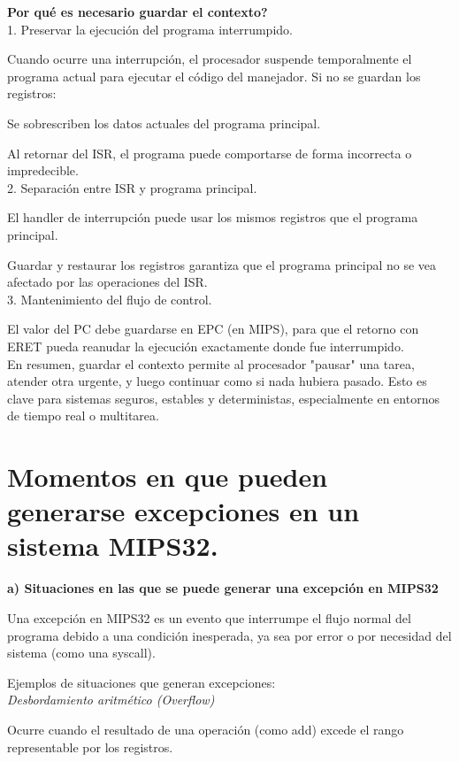 \documentclass[]{article}
\begin{document}
\textbf{Por qué es necesario guardar el contexto?} \\

1. Preservar la ejecución del programa interrumpido.

Cuando ocurre una interrupción, el procesador suspende temporalmente el programa actual para ejecutar el código del manejador. Si no se guardan los registros:

Se sobrescriben los datos actuales del programa principal.

Al retornar del ISR, el programa puede comportarse de forma incorrecta o impredecible. \\

2. Separación entre ISR y programa principal.

El handler de interrupción puede usar los mismos registros que el programa principal.

Guardar y restaurar los registros garantiza que el programa principal no se vea afectado por las operaciones del ISR. \\

3. Mantenimiento del flujo de control.

El valor del PC debe guardarse en EPC (en MIPS), para que el retorno con ERET pueda reanudar la ejecución exactamente donde fue interrumpido. \\

En resumen, guardar el contexto permite al procesador "pausar" una tarea, atender otra urgente, y luego continuar como si nada hubiera pasado. Esto es clave para sistemas seguros, estables y deterministas, especialmente en entornos de tiempo real o multitarea.

\section{Momentos en que pueden generarse excepciones en un sistema MIPS32.}

\textbf{a) Situaciones en las que se puede generar una excepción en MIPS32}

Una excepción en MIPS32 es un evento que interrumpe el flujo normal del programa debido a una condición inesperada, ya sea por error o por necesidad del sistema (como una syscall).

Ejemplos de situaciones que generan excepciones: \\

\textit{Desbordamiento aritmético (Overflow)}

Ocurre cuando el resultado de una operación (como add) excede el rango representable por los registros. 
\end{document}
